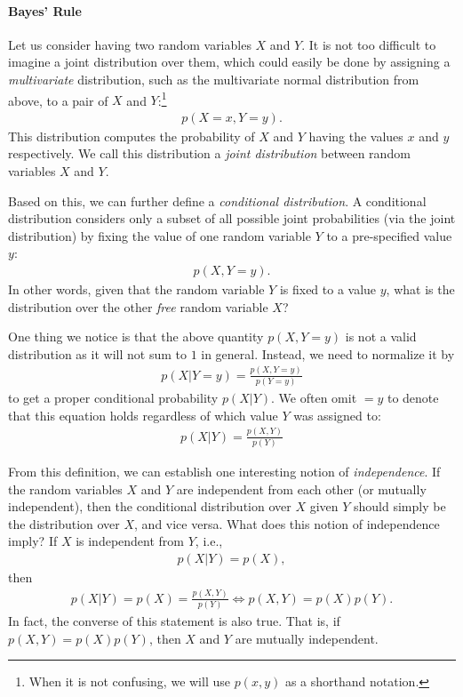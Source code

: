 \documentclass{report}
\begin{document}
\paragraph{Bayes' Rule}

Let us consider having two random variables $X$ and $Y$. It is not too difficult
to imagine a joint distribution over them, which could easily be done by
assigning a {\it multivariate} distribution, such as the multivariate normal
distribution from above, to a pair of $X$ and $Y$:\footnote{
    When it is not confusing, we will use $p(x,y)$ as a shorthand notation.
}
\begin{align*}
    p(X=x, Y=y).
\end{align*}
This distribution computes the probability of $X$ and $Y$ having the values $x$
and $y$ respectively. We call this distribution a {\it joint distribution}
between random variables $X$ and $Y$.

Based on this, we can further define a {\it conditional distribution}. A
conditional distribution considers only a subset of all possible joint
probabilities (via the joint distribution) by fixing the value of one random
variable $Y$ to a pre-specified value $y$:
\begin{align*}
    p(X, Y=y).
\end{align*}
In other words, given that the random variable $Y$ is fixed to a value $y$, what
is the distribution over the other {\it free} random variable $X$?

One thing we notice is that the above quantity $p(X, Y=y)$ is not a valid
distribution as it will not sum to $1$ in general. Instead, we need to normalize
it by 
\begin{align*}
    p(X|Y=y) = \frac{p(X, Y=y)}{p(Y=y)}
\end{align*}
to get a proper conditional probability $p(X|Y)$. We often omit $=y$ to denote
that this equation holds regardless of which value $Y$ was assigned to:
\begin{align}
    \label{eq:condprob}
    p(X|Y) = \frac{p(X, Y)}{p(Y)}
\end{align}

From this definition, we can establish one interesting notion of {\it
independence}. If the random variables $X$ and $Y$ are independent from each
other (or mutually independent), then the conditional distribution over $X$
given $Y$ should simply be the distribution over $X$, and vice versa. What does
this notion of independence imply?
If $X$ is independent from $Y$, i.e.,
\begin{align*}
    p(X|Y) = p(X),
\end{align*}
then
\begin{align}
    \label{eq:independence}
    p(X|Y) = p(X) = \frac{p(X, Y)}{p(Y)} 
    \iff p(X, Y) = p(X)p(Y).
\end{align}
In fact, the converse of this statement is also true. That is, if $p(X, Y) =
p(X)p(Y)$, then $X$ and $Y$ are mutually independent.   
\end{document}
